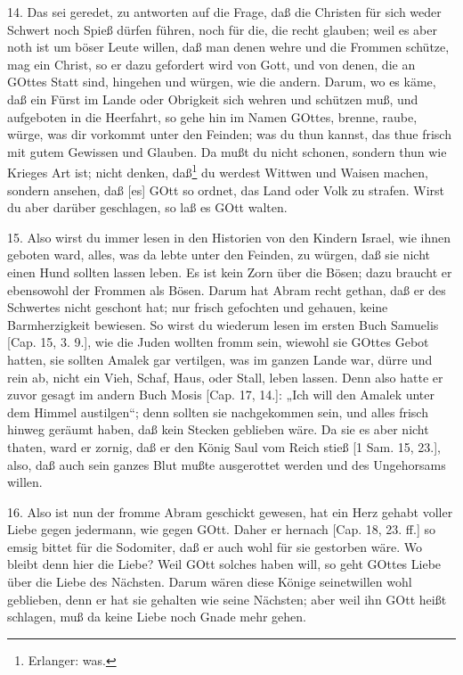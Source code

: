 14. Das sei geredet, zu antworten auf die Frage, daß die Christen für sich weder Schwert noch Spieß dürfen führen, noch für die, die recht glauben; weil es aber noth ist um böser Leute willen, daß man denen wehre und die Frommen schütze, mag ein Christ, so er dazu gefordert wird von Gott, und von denen, die an GOttes Statt sind, hingehen und würgen, wie die andern. Darum, wo es käme, daß ein Fürst im Lande oder Obrigkeit sich wehren und schützen muß, und aufgeboten in die Heerfahrt, so gehe hin im Namen GOttes, brenne, raube, würge, was dir vorkommt unter den Feinden; was du thun kannst, das thue frisch mit gutem Gewissen und Glauben. Da mußt du nicht schonen, sondern thun wie Krieges Art ist; nicht denken, daß\footnote{Erlanger: was.} du werdest Wittwen und Waisen machen, sondern ansehen, daß [es] GOtt so ordnet, das Land oder Volk zu strafen. Wirst du aber darüber geschlagen, so laß es GOtt walten.

15. Also wirst du immer lesen in den Historien von den Kindern Israel, wie ihnen geboten ward, alles, was da lebte unter den Feinden, zu würgen, daß sie nicht einen Hund sollten lassen leben. Es ist kein Zorn über die Bösen; dazu braucht er ebensowohl der Frommen als Bösen. Darum hat Abram recht gethan, daß er des Schwertes nicht geschont hat; nur frisch gefochten und gehauen, keine Barmherzigkeit bewiesen. So wirst du wiederum lesen im ersten Buch Samuelis [Cap. 15, 3. 9.], wie die Juden wollten fromm sein, wiewohl sie GOttes Gebot hatten, sie sollten Amalek gar vertilgen, was im ganzen Lande war, dürre und rein ab, nicht ein Vieh, Schaf, Haus, oder Stall, leben lassen. Denn also hatte er zuvor gesagt im andern Buch Mosis [Cap. 17, 14.]: „Ich will den Amalek unter dem Himmel austilgen“; denn sollten sie nachgekommen sein, und alles frisch hinweg geräumt haben, daß kein Stecken geblieben wäre. Da sie es aber nicht thaten, ward er zornig, daß er den König Saul vom Reich stieß [1 Sam. 15, 23.], also, daß auch sein ganzes Blut mußte ausgerottet werden und des Ungehorsams willen.

16. Also ist nun der fromme Abram geschickt gewesen, hat ein Herz gehabt voller Liebe gegen jedermann, wie gegen GOtt. Daher er hernach [Cap. 18, 23. ff.] so emsig bittet für die Sodomiter, daß er auch wohl für sie gestorben wäre. Wo bleibt denn hier die Liebe? Weil GOtt solches haben will, so geht GOttes Liebe über die Liebe des Nächsten. Darum wären diese Könige seinetwillen wohl geblieben, denn er hat sie gehalten wie seine Nächsten; aber weil ihn GOtt heißt schlagen, muß da keine Liebe noch Gnade mehr gehen.

